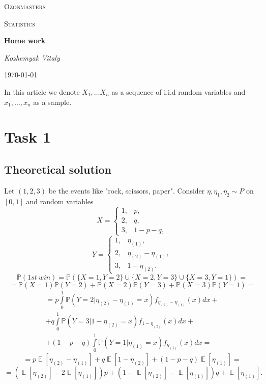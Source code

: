 \documentclass[a4paper, 12pt]{article}
\DeclareMathOperator*{\E}{\mathbb{E}}
\renewcommand*{\P}{\mathbb{P}}
\begin{document}
 

\begin{titlepage}
	\centering
	{\scshape\LARGE Ozonmasters \par}
	\vspace{1cm}
	{\scshape\Large Statistics \par}
	\vspace{1.5cm}
	{\huge\bfseries Home work \par}
	\vspace{2cm}
	{\Large\itshape Kozhemyak Vitaly \par}
	\vfill

	{\large \today\par}
\end{titlepage}
  
\tableofcontents

\newpage
 
In this article we denote $X_1, \ldots X_n$ as a sequence of i.i.d random variables and $x_1, \ldots, x_n$ as a sample.
\section{Task 1}
\subsection{Theoretical solution} Let $(1, 2, 3)$ be the events like "rock, scissors, paper". Consider $\eta, \eta_1, \eta_2 \sim P$ on $[0, 1]$ and random variables 
$$
X = 
\begin{cases}
1, & p, \\
2, & q, \\
3, & 1 - p - q,
\end{cases}
$$
$$
Y = 
\begin{cases}
1, & \eta_{(1)}, \\
2, & \eta_{(2)} - \eta_{(1)}, \\
3, & 1 - \eta_{(2)}.
\end{cases}
$$
$$
\P (1st \ win) = \P(\{ X=1, Y=2\} \cup \{ X=2, Y=3 \} \cup \{ X=3, Y=1 \}) = 
$$
$$
 = \P(X=1) \P(Y=2) + \P(X=2) \P(Y=3) + \P(X=3) \P(Y=1) = 
$$
\begin{eqnarray*}
= p \int \limits_0^1 \P(Y=2 | \eta_{(2)} - \eta_{(1)} = x) f_{\eta_{(2)} - \eta_{(1)}}(x) dx + \\
+ q \int \limits_0^1 \P(Y=3 | 1 - \eta_{(2)} = x) f_{1-\eta_{(2)}}(x) dx + \\
+ (1 - p - q) \int \limits_0^1 \P(Y=1 | \eta_{(1)} = x) f_{\eta_{(1)}}(x) dx = 
\end{eqnarray*}
$$
= p\E [\eta_{(2)} - \eta_{(1)}] + q \E [1 - \eta_{(2)}] + (1 - p - q) \E[\eta_{(1)}] = 
$$
\begin{equation}
\label{expected_value}
= (\E [\eta_{(2)}] - 2\E[\eta_{(1)}] ) p  + (1 - \E [\eta_{(2)}] - \E[\eta_{(1)}]) q  + \E[\eta_{(1)}].
\end{equation}
\end{document}
